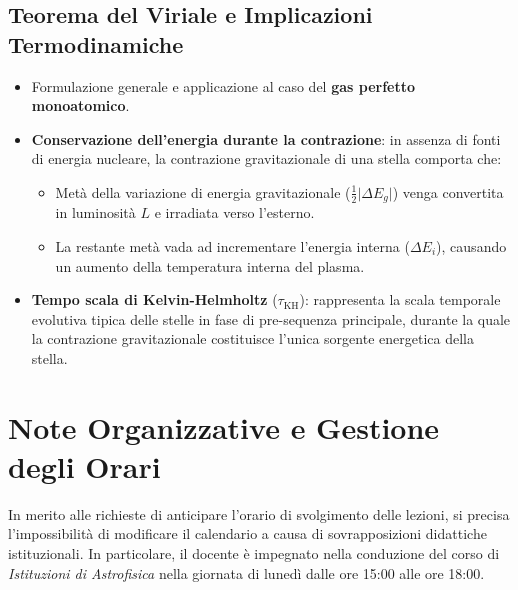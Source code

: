 \subsection{Teorema del Viriale e Implicazioni Termodinamiche}
\begin{itemize}
\item Formulazione generale e applicazione al caso del \textbf{gas perfetto monoatomico}.
\item \textbf{Conservazione dell'energia durante la contrazione}: in assenza di fonti di energia nucleare, la contrazione gravitazionale di una stella comporta che:
\begin{itemize}
\item Metà della variazione di energia gravitazionale ($\frac{1}{2} \vert{}\Delta E_g\vert{}$) venga convertita in luminosità $L$ e irradiata verso l'esterno.
\item La restante metà vada ad incrementare l'energia interna ($\Delta E_i$), causando un aumento della temperatura interna del plasma.
\end{itemize}
\item \textbf{Tempo scala di Kelvin-Helmholtz} ($\tau_{\text{KH}}$): rappresenta la scala temporale evolutiva tipica delle stelle in fase di pre-sequenza principale, durante la quale la contrazione gravitazionale costituisce l'unica sorgente energetica della stella.
\end{itemize}

\section{Note Organizzative e Gestione degli Orari}

In merito alle richieste di anticipare l'orario di svolgimento delle lezioni, si precisa l'impossibilità di modificare il calendario a causa di sovrapposizioni didattiche istituzionali. In particolare, il docente è impegnato nella conduzione del corso di \textit{Istituzioni di Astrofisica} nella giornata di lunedì dalle ore 15:00 alle ore 18:00.